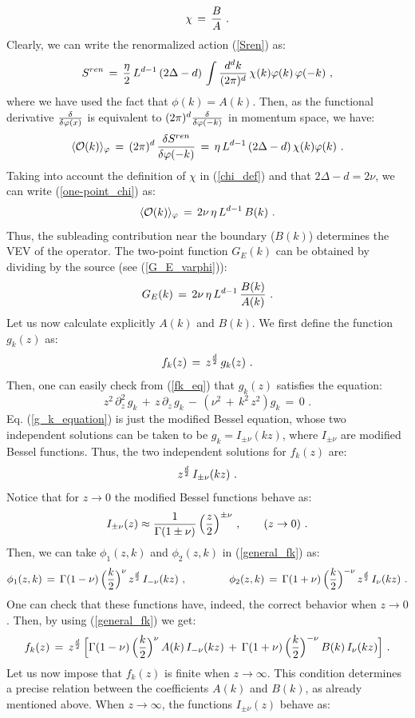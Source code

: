 \documentclass[12pt,notitlepage]{article}
\newcommand{\beq}{\begin{equation}}
\newcommand{\eeq}{\end{equation}}
\begin{document}
\beq
\chi\,=\,{B\over A}\,\,.
\label{chi_def}
\eeq
Clearly, we can write the renormalized action (\ref{Sren}) as:
\beq
S^{ren}\,=\,{\eta\over 2}\, L^{d-1}\,(2\Delta-d)\,
\int {d^dk\over (2\pi)^d}\,\chi(k) 
\varphi(k)\,\varphi(-k)\,\,,
\eeq
where we have used the fact that $\phi(k)=A(k)$. Then, as the functional derivative 
${\delta\over \delta \varphi(x)}$ is equivalent to $(2\pi)^d {\delta\over \delta \varphi(-k)}$ in momentum space, we have:
\beq
\langle {\cal O}( k)\rangle_{\varphi}\,=\,(2\pi)^d \,{\delta S^{ren}\over \delta \varphi(-k)}\,=\,
\eta\,L^{d-1}\,(2\Delta-d)\,\chi(k) 
\varphi(k)\,\,.
\label{one-point_chi}
\eeq
Taking into account the definition of $\chi$ in (\ref{chi_def}) and that $2\Delta-d=2\nu$, we can write (\ref{one-point_chi}) as:
\beq
\langle {\cal O}( k)\rangle_{\varphi}\,=\,2\nu\,\eta \,L^{d-1}\, B(k)\,\,.
\eeq
Thus, the subleading contribution near the boundary ($B(k)$) determines the VEV of the operator. The two-point function $G_E(k)$ can be obtained by dividing by the source (see (\ref{G_E_varphi})):
\beq
G_E(k)\,=\,2\nu\,\eta \,L^{d-1}\,{B(k) \over A(k)}\,\,.
\eeq
Let us now calculate explicitly $A(k)$ and $B(k)$. We first define the function $g_k(z)$ as:
\beq
f_k(z)\,=\,z^{{d\over 2}}\,g_k(z)\,\,.
\eeq
Then, one can easily check from (\ref{fk_eq}) that $g_k(z)$ satisfies the equation:
\beq
z^2\,\partial_z^2\,g_k\,+\,z\,\partial_z\,g_k\,-\,(\nu^2\,+\,k^2\,z^2)g_k\,=\,0\,\,.
\label{g_k_equation}
\eeq
Eq. (\ref{g_k_equation}) is just  the modified Bessel equation, whose two independent solutions can be taken to be $g_k=I_{\pm \nu}(kz)$, where $I_{\pm \nu}$ are modified Bessel functions. Thus, the two independent solutions for $f_k(z)$ are:
\beq
z^{{d\over 2}}\,I_{\pm \nu}(kz)\,\,.
\eeq
Notice that for $z\to 0$ the modified Bessel functions behave as:
\beq
I_{\pm \nu}(z)\approx {1\over \Gamma(1\pm \nu)}\, \Big({z\over 2}\Big)^{\pm\nu}
\,\,,
\qquad (z\to 0)\,\,.
\eeq
Then, we can take $\phi_1(z,k)$ and $\phi_2(z,k)$  in (\ref{general_fk}) as:
\beq
\phi_1(z,k)\,=\,\Gamma(1- \nu)\,\Big({k\over 2}\Big)^{\nu}\,z^{{d\over 2}}\,I_{-\nu}(kz)
\,\,,
\qquad\qquad
\phi_2(z,k)\,=\,\Gamma(1+ \nu)\,\Big({k\over 2}\Big)^{-\nu}\,z^{{d\over 2}}\,I_{\nu}(kz)\,\,.
\eeq
One can check that these functions have, indeed, the correct behavior when $z\to 0$. Then, by using (\ref{general_fk}) we get:
\beq
f_k(z)\,=\,z^{{d\over 2}}\,\Big[
\Gamma(1- \nu)\,\Big({k\over 2}\Big)^{\nu}\,A(k)\,I_{-\nu}(kz)\,+\,
\Gamma(1+ \nu)\,\Big({k\over 2}\Big)^{-\nu}\,B(k)\,I_{\nu}(kz)\Big]\,\,.
\eeq
Let us now impose that $f_k(z)$ is finite when $z\to \infty$. This condition determines a precise relation between the coefficients $A(k)$ and $B(k)$, as already mentioned above. When $z\to \infty$, the functions $I_{\pm \nu}(z)$ behave as:
\end{document}

